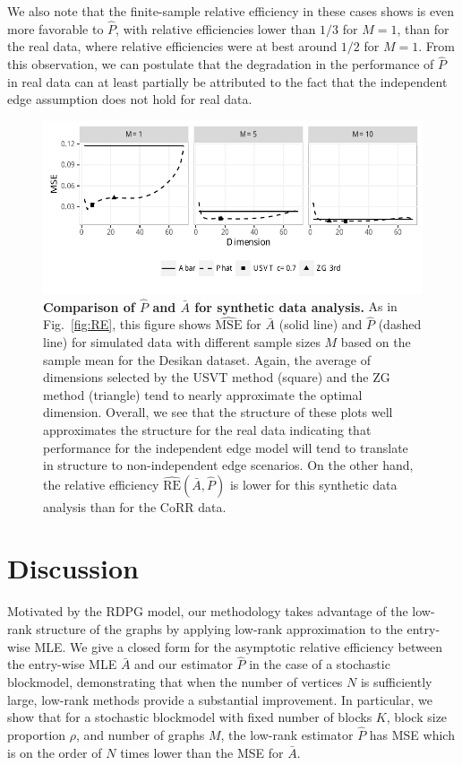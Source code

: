 \documentclass[10pt,letterpaper]{article}
\renewcommand{\hat}{\widehat}
\begin{document}
We also note that the finite-sample relative efficiency in these cases shows is even more favorable to $\hat{P}$, with relative efficiencies lower than $1/3$ for $M=1$, than for the real data, where relative efficiencies were at best around $1/2$ for $M=1$.
From this observation, we can postulate that the degradation in the performance of $\hat{P}$ in real data can at least partially be attributed to the fact that the independent edge assumption does not hold for real data.


\begin{figure}[!htb]
\centering
\includegraphics[width=1\textwidth]{sim_desikan.pdf}
\caption{{\bf Comparison of $\hat{P}$ and $\bar{A}$ for synthetic data analysis.}
As in Fig.~\ref{fig:RE}, this figure shows $\hat{\mathrm{MSE}}$ for $\bar{A}$ (solid line) and $\hat{P}$ (dashed line) for simulated data with different sample sizes $M$ based on the sample mean for the Desikan dataset. Again, the average of dimensions selected by the USVT method (square) and the ZG method (triangle) tend to nearly approximate the optimal dimension. 
Overall, we see that the structure of these plots well approximates the structure for the real data indicating that performance for the independent edge model will tend to translate in structure to non-independent edge scenarios. 
On the other hand, the relative efficiency $\hat{\mathrm{RE}}(\bar{A},\hat{P})$ is lower for this synthetic data analysis than for the CoRR data.}
\label{fig:sim_desikan}
\end{figure}



\section{Discussion}\label{sec:discussion}

Motivated by the RDPG model, our methodology takes advantage of the low-rank structure of the graphs by applying low-rank approximation to the entry-wise MLE. 
We give a closed form for the asymptotic relative efficiency between the entry-wise MLE $\bar{A}$ and our estimator $\hat{P}$ in the case of a stochastic blockmodel, demonstrating that when the number of vertices $N$ is sufficiently large, low-rank methods provide a substantial improvement.
In particular, we show that for a stochastic blockmodel with fixed number of blocks $K$, block size proportion $\rho$, and number of graphs $M$, the low-rank estimator $\hat{P}$ has MSE which is on the order of $N$ times lower than the MSE for $\bar{A}$.
\end{document}
